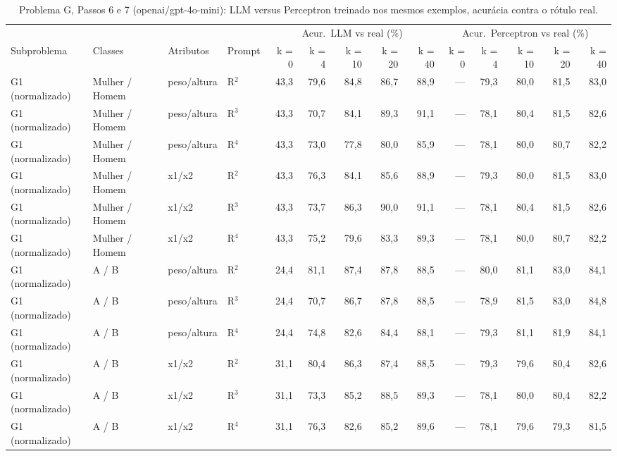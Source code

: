 \begin{table}[htbp]
\centering
\footnotesize
\caption{Problema G, Passos 6 e 7 (openai/gpt-4o-mini): LLM versus Perceptron treinado nos mesmos exemplos, acurácia contra o rótulo real.}
\label{tab:bloco3_G_passo7_LLM_vs_perceptron_gpt4mini}
\begin{tabular}{llllrrrrrrrrrr}
\toprule
 &  &  &  & \multicolumn{5}{c}{Acur.\ LLM vs real (\%)} & \multicolumn{5}{c}{Acur.\ Perceptron vs real (\%)} \\ \cmidrule(lr){5-9} \cmidrule(lr){10-14}
Subproblema & Classes & Atributos & Prompt & k = 0 & k = 4 & k = 10 & k = 20 & k = 40 & k = 0 & k = 4 & k = 10 & k = 20 & k = 40 \\
\midrule
G1 (normalizado) & Mulher / Homem & peso/altura & R$^2$ & 43,3 & 79,6 & 84,8 & 86,7 & 88,9 & — & 79,3 & 80,0 & 81,5 & 83,0 \\
G1 (normalizado) & Mulher / Homem & peso/altura & R$^3$ & 43,3 & 70,7 & 84,1 & 89,3 & 91,1 & — & 78,1 & 80,4 & 81,5 & 82,6 \\
G1 (normalizado) & Mulher / Homem & peso/altura & R$^4$ & 43,3 & 73,0 & 77,8 & 80,0 & 85,9 & — & 78,1 & 80,0 & 80,7 & 82,2 \\
G1 (normalizado) & Mulher / Homem & x1/x2 & R$^2$ & 43,3 & 76,3 & 84,1 & 85,6 & 88,9 & — & 79,3 & 80,0 & 81,5 & 83,0 \\
G1 (normalizado) & Mulher / Homem & x1/x2 & R$^3$ & 43,3 & 73,7 & 86,3 & 90,0 & 91,1 & — & 78,1 & 80,4 & 81,5 & 82,6 \\
G1 (normalizado) & Mulher / Homem & x1/x2 & R$^4$ & 43,3 & 75,2 & 79,6 & 83,3 & 89,3 & — & 78,1 & 80,0 & 80,7 & 82,2 \\
G1 (normalizado) & A / B & peso/altura & R$^2$ & 24,4 & 81,1 & 87,4 & 87,8 & 88,5 & — & 80,0 & 81,1 & 83,0 & 84,1 \\
G1 (normalizado) & A / B & peso/altura & R$^3$ & 24,4 & 70,7 & 86,7 & 87,8 & 88,5 & — & 78,9 & 81,5 & 83,0 & 84,8 \\
G1 (normalizado) & A / B & peso/altura & R$^4$ & 24,4 & 74,8 & 82,6 & 84,4 & 88,1 & — & 79,3 & 81,1 & 81,9 & 84,1 \\
G1 (normalizado) & A / B & x1/x2 & R$^2$ & 31,1 & 80,4 & 86,3 & 87,4 & 88,5 & — & 79,3 & 79,6 & 80,4 & 82,6 \\
G1 (normalizado) & A / B & x1/x2 & R$^3$ & 31,1 & 73,3 & 85,2 & 88,5 & 89,3 & — & 78,1 & 80,0 & 80,4 & 82,2 \\
G1 (normalizado) & A / B & x1/x2 & R$^4$ & 31,1 & 76,3 & 82,6 & 85,2 & 89,6 & — & 78,1 & 79,6 & 79,3 & 81,5 \\

\end{tabular}
\end{table}

